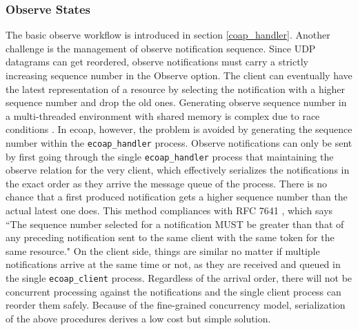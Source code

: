 \subsubsection{Observe States}

The basic observe workflow is introduced in section \ref{coap_handler}. Another challenge is the management of observe notification sequence. Since UDP datagrams can get reordered, observe notifications must carry a strictly increasing sequence number in the Observe option. The client can eventually have the latest representation of a resource by selecting the notification with a higher sequence number and drop the old ones. Generating observe sequence number in a multi-threaded environment with shared memory is complex due to race conditions \cite{kovatsch2015scalable}. In ecoap, however, the problem is avoided by generating the sequence number within the \verb|ecoap_handler| process. Observe notifications can only be sent by first going through the single \verb|ecoap_handler| process that maintaining the observe relation for the very client, which effectively serializes the notifications in the exact order as they arrive the message queue of the process. There is no chance that a first produced notification gets a higher sequence number than the actual latest one does. This method compliances with RFC 7641 \cite{coap_observe}, which says ``The sequence number selected for a notification MUST be greater than that of any preceding notification sent to the same client with the same token for the same resource." On the client side, things are similar no matter if multiple notifications arrive at the same time or not, as they are received and queued in the single \verb|ecoap_client| process. Regardless of the arrival order, there will not be concurrent processing against the notifications and the single client process can reorder them safely. Because of the fine-grained concurrency model, serialization of the above procedures derives a low cost but simple solution. 





